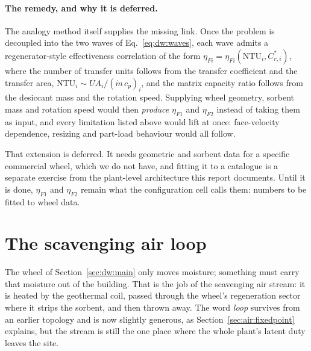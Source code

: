 \documentclass[11pt]{article}
\newcommand{\md}{\ensuremath{\dot m}}
\newcommand{\UA}{\ensuremath{U\!A}}
\begin{document}
\paragraph{The remedy, and why it is deferred.} The analogy method itself
supplies the missing link. Once the problem is decoupled into the two waves of
Eq.~\eqref{eq:dw:waves}, each wave admits a regenerator-style effectiveness
correlation of the form $\eta_{Fi} = \eta_{Fi}(\mathrm{NTU}_i,
C_{r,i}^{*})$, where the number of transfer units follows from the transfer
coefficient and the transfer area, $\mathrm{NTU}_i \sim \UA_i/(\md\,c_p)_i$,
and the matrix capacity ratio follows from the desiccant mass and the
rotation speed. Supplying wheel geometry, sorbent mass and rotation speed
would then \emph{produce} $\eta_{F1}$ and $\eta_{F2}$ instead of taking them
as input, and every limitation listed above would lift at once: face-velocity
dependence, resizing and part-load behaviour would all follow.

That extension is deferred. It needs geometric and sorbent data for a specific
commercial wheel, which we do not have, and fitting it to a catalogue is a
separate exercise from the plant-level architecture this report documents.
Until it is done, $\eta_{F1}$ and $\eta_{F2}$ remain what the configuration
cell calls them: numbers to be fitted to wheel data.

%

\section{The scavenging air loop}
\label{sec:air:scav}

The wheel of Section~\ref{sec:dw:main} only moves moisture; something must
carry that moisture out of the building. That is the job of the scavenging
air stream: it is heated by the geothermal coil, passed through the wheel's
regeneration sector where it strips the sorbent, and then thrown away. The
word \emph{loop} survives from an earlier topology and is now slightly
generous, as Section~\ref{sec:air:fixedpoint} explains, but the stream is
still the one place where the whole plant's latent duty leaves the site.
\end{document}
